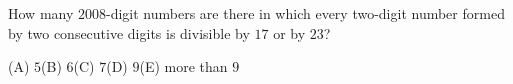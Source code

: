 How many $2008$-digit numbers are there in which every two-digit number formed by two consecutive digits is divisible by $17$ or by $23$?

(A) $5$\quad (B) $6$\quad (C) $7$\quad (D) $9$\quad (E) more than $9$
